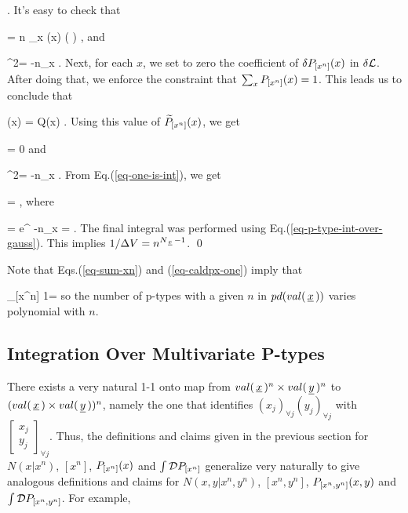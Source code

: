 \documentclass[12pt]{article}
\begin{document}
\beq
\delta {}
\;.
\eeq
It's easy to check that

\beq
\delta \call=
n \sum_x \delta {}(x)\ln
\left(
\right)
\;,
\eeq
and

\beq
\delta^2\call=
-n\sum_x
\;.
\eeq
Next, for each $x$,
we set to zero
the coefficient
of
$\delta {P_{[x^n]} }(x)$
in $\delta { \cal L }$.
After doing that, we
enforce the constraint
that $\sum_x {P_{[x^n]} }(x)=1$.
This leads us to conclude that


\beq
{}(x) = Q(x)
\;.
\eeq
Using this value of
${\widetilde{P}_{[x^n]} }(x)$,
we get

\beq
\tcall = 0
\;
\eeq
and

\beq
\delta^2\tcall=
-n\sum_x
\;.
\eeq
From Eq.(\ref{eq-one-is-int}),
we get

=\Gamma
\;,
\eeq
where

\beq
\Gamma =\int \cald {}
e^{
-n\sum_x
}
=
\;.
\eeq
The final integral was performed
using Eq.(\ref{eq-p-type-int-over-gauss}).
This implies $1/\Delta V= n^{N_{\,\underline{x}\,}-1}$.
\qed

Note that Eqs.(\ref{eq-sum-xn})
and (\ref{eq-caldpx-one}) imply that

\beq
\sum_{[x^n]}
1=
\;
\eeq
so the number
of p-types
with a given $n$
in $pd(val({\,\underline{x}\,}))$
varies polynomial with $n$.


\subsection{Integration Over Multivariate P-types}

There exists
a very natural 1-1 onto map from
$val({\,\underline{x}\,})^n\times val({\,\underline{y}\,})^n$
to $(val({\,\underline{x}\,})\times val({\,\underline{y}\,}))^n$,
namely the one that
identifies $(x_j)_{\forall j}(y_j)_{\forall j}$
with $\left[\begin{array}{c}x_j\\y_j
\end{array}\right]_{\forall j}$. Thus,
the definitions
and claims given in the previous
section for $N(x|x^n)$, $[x^n]$,
${P_{[x^n]} }(x)$ and
$\int { \cal D } {P_{[x^n]} }$
generalize very naturally to
give analogous definitions and claims
for
$N(x,y|x^n, y^n)$, $[x^n, y^n]$,
${P_{[x^n,y^n]} }(x,y)$ and
$\int { \cal D } {P_{[x^n,y^n]} }$.
For example,
\end{document}
